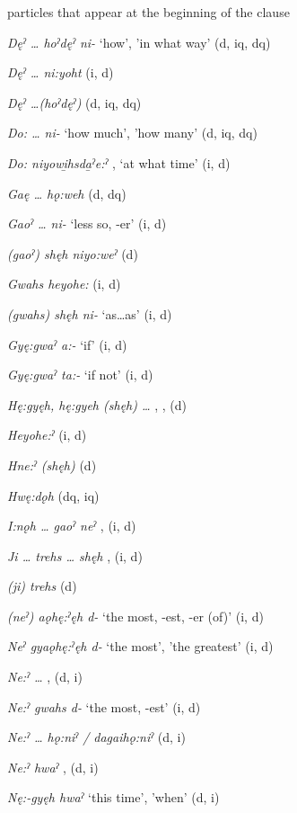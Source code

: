 \ea
\label{ex:particleclauseorder1}
particles that appear at the beginning of the clause
\begin{multicols}{2} 

\textit{Dęˀ … hoˀdęˀ ni-} ‘how’, 'in what way’ (d, iq, dq)

\textit{Dęˀ … ni:yoht}  (i, d)

\textit{Dęˀ …(hoˀdęˀ)}  (d, iq, dq)

\textit{Do: … ni-} ‘how much’, 'how many’ (d, iq, dq)

\textit{Do: niyowi̱hsda̱ˀe:ˀ} , `at what time’ (i, d)

\textit{Gaę … hǫ:weh}  (d, dq)

\textit{Gaoˀ … ni-} ‘less so, -er’ (i, d)

\textit{(gaoˀ) shęh niyo:weˀ}  (d)

\textit{Gwahs heyohe:}  (i, d)

\textit{(gwahs) shęh ni-} ‘as…as’ (i, d)

\textit{Gyę:gwaˀ a:-} ‘if’ (i, d)

\textit{Gyę:gwaˀ ta:-} ‘if not’ (i, d)

\textit{Hę:gyęh, hę:gyeh (shęh) …} , ,  (d)

\textit{Heyohe:ˀ}  (i, d)

\textit{Hne:ˀ (shęh)}  (d)

\textit{Hwę:dǫh}  (dq, iq)

\textit{I:nǫh … gaoˀ neˀ} ,  (i, d)

\textit{Ji … trehs … shęh} ,  (i, d)

\textit{(ji) trehs}  (d)

\textit{(neˀ) aǫhę:ˀęh d-} ‘the most, -est, -er (of)’ (i, d)

\textit{Neˀ gyaǫhę:ˀęh d-} ‘the most’, 'the greatest’ (i, d)

\textit{Ne:ˀ …} ,  (d, i)

\textit{Ne:ˀ gwahs d-} ‘the most, -est’ (i, d)

\textit{Ne:ˀ … hǫ:niˀ / dagaihǫ:niˀ}  (d, i)

\textit{Ne:ˀ hwaˀ} ,  (d, i)

\textit{Nę:-gyęh hwaˀ} ‘this time’, 'when’ (d, i)


\end{multicols}
